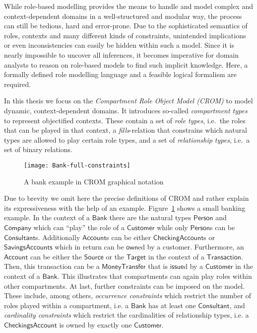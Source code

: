 \documentclass[final]{scrartcl}
\begin{document}
While role-based modelling provides the means to handle and model complex and context-dependent
domains in a well-structured and modular way, the process can still be tedious, hard and
error-prone. Due to the sophisticated semantics of roles, contexts and many different kinds of
constraints, unintended implications or even inconsistencies can easily be hidden within such a
model. Since it is nearly impossible to uncover all inferences, it becomes imperative for domain
analysts to reason on role-based models to find such implicit knowledge.  Here, a formally defined
role modelling language and a feasible logical formalism are required.


In this thesis we focus on the \emph{Compartment Role Object Model (CROM)} \cite{KBG-SLE15} to model
dynamic, context-dependent domains. It introduces so-called \emph{compartment types} to represent
objectified contexts. These contain a set of \emph{role types}, i.e.\ the roles that can be played
in that context, a \emph{fills}-relation that constrains which natural types are allowed to play
certain role types, and a set of \emph{relationship types}, i.e.\ a set of binary relations.
%
\begin{figure}
  \centering
  \texttt{[image: Bank-full-constraints]}
  \caption{A bank example in CROM graphical notation}
  \label{fig:crom}
\end{figure}
%
Due to brevity we omit here the precise definitions of CROM and rather explain its expressiveness
with the help of an example. Figure~\ref{fig:crom} shows a small banking example. In the context of
a $\mathsf{Bank}$ there are the natural types $\mathsf{Person}$ and $\mathsf{Company}$ which can
``play'' the role of a $\mathsf{Customer}$ while only $\mathsf{Person}$s can be
$\mathsf{Consultant}$s. Additionally $\mathsf{Account}$s can be either $\mathsf{CheckingAccount}$s
or $\mathsf{SavingsAccounts}$ which in return can be $\mathsf{own}$ed by a customer. Furthermore, an
$\mathsf{Account}$ can be either the $\mathsf{Source}$ or the $\mathsf{Target}$ in the context of a
$\mathsf{Transaction}$. Then, this transaction can be a $\mathsf{MoneyTransfer}$ that is
$\mathsf{issue}$d by a $\mathsf{Customer}$ in the context of a $\mathsf{Bank}$. This illustrates
that compartments can again play roles within other compartments. At last, further constraints can
be imposed on the model. These include, among others, \emph{occurrence constraints} which restrict
the number of roles played within a compartment, i.e. a $\mathsf{Bank}$ has at least one
$\mathsf{Consultant}$, and \emph{cardinality constraints} which restrict the cardinalities of
relationship types, i.e. a $\mathsf{CheckingsAccount}$ is owned by exactly one $\mathsf{Customer}$.
\end{document}

